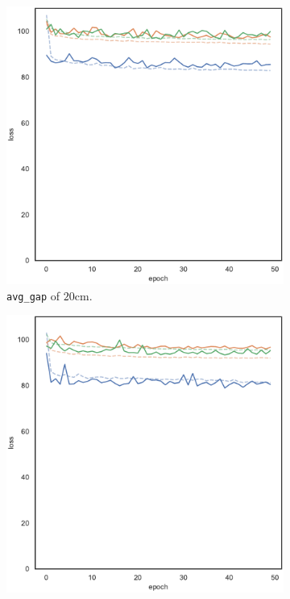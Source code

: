 \begin{figure}[!htb]
\begin{center}
\begin{subfigure}[h]{0.32\textwidth}
			\includegraphics[width=\textwidth]{contents/images/task1-comm-extension/loss-distributed-gap_20@copy}%
			\caption{\texttt{avg\_gap} of $20$\gls{cm}.}
		\end{subfigure}
		\hfill
		\begin{subfigure}[h]{0.32\textwidth}
			\includegraphics[width=\textwidth]{contents/images/task1-comm-extension/loss-distributed-gap_var@copy}

\end{subfigure}
\end{center}
\end{figure}
